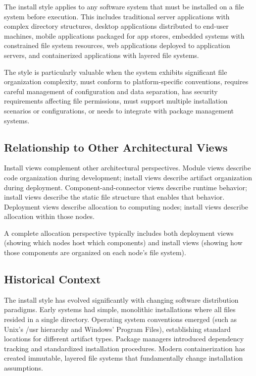 \documentclass[11pt]{article}
\begin{document}
The install style applies to any software system that must be installed on a file system before execution. This includes traditional server applications with complex directory structures, desktop applications distributed to end-user machines, mobile applications packaged for app stores, embedded systems with constrained file system resources, web applications deployed to application servers, and containerized applications with layered file systems.

The style is particularly valuable when the system exhibits significant file organization complexity, must conform to platform-specific conventions, requires careful management of configuration and data separation, has security requirements affecting file permissions, must support multiple installation scenarios or configurations, or needs to integrate with package management systems.

\subsection{Relationship to Other Architectural Views}

Install views complement other architectural perspectives. Module views describe code organization during development; install views describe artifact organization during deployment. Component-and-connector views describe runtime behavior; install views describe the static file structure that enables that behavior. Deployment views describe allocation to computing nodes; install views describe allocation within those nodes.

A complete allocation perspective typically includes both deployment views (showing which nodes host which components) and install views (showing how those components are organized on each node's file system).

\subsection{Historical Context}

The install style has evolved significantly with changing software distribution paradigms. Early systems had simple, monolithic installations where all files resided in a single directory. Operating system conventions emerged (such as Unix's /usr hierarchy and Windows' Program Files), establishing standard locations for different artifact types. Package managers introduced dependency tracking and standardized installation procedures. Modern containerization has created immutable, layered file systems that fundamentally change installation assumptions.
\end{document}
